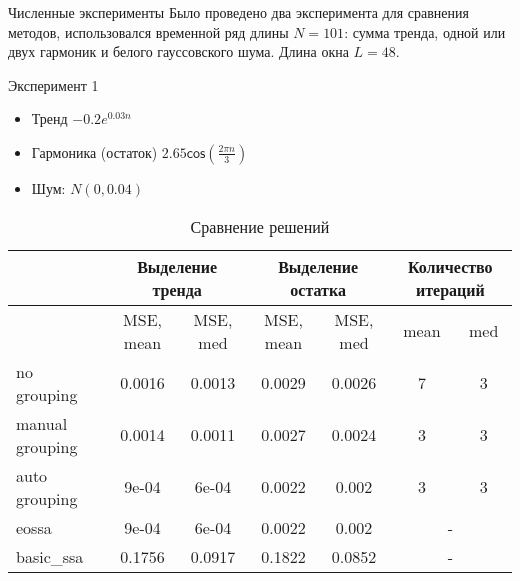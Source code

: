 \documentclass[ucs, notheorems, handout]{beamer}
\begin{document}
\begin{frame}{Численные эксперименты}
\small
    Было проведено два эксперимента для сравнения методов, использовался временной ряд длины $N = 101$: сумма тренда, одной или двух гармоник и белого гауссовского шума. Длина окна $L = 48$.

    Эксперимент 1
    \begin{itemize}
        \item Тренд $-0.2 e^{0.03n}$
        \item Гармоника (остаток) $2.65 \mathsf{cos}(\frac{2\pi n}{3})$
        \item Шум: ${N}(0, 0.04)$
    \end{itemize}

\begin{table}[h]
\tiny
\caption{\footnotesize Сравнение решений}
\begin{center}
\tabcolsep=0.11cm
\begin{tabular}{|l | c| c| c| c| c| c|}
\hline
 & \multicolumn{2}{c|}{Выделение тренда} & \multicolumn{2}{c|}{Выделение остатка} & \multicolumn{2}{c|}{Количество итераций} \\
 \hline
 & MSE, mean & MSE, med & MSE, mean & MSE, med & mean & med  \\
\hline
no grouping & 0.0016 &  0.0013 & 0.0029 &  0.0026 & 7 & 3 \\
manual grouping &  0.0014 & 0.0011 & 0.0027 & 0.0024 & 3 & 3 \\
auto grouping &  9e-04 & 6e-04 & 0.0022 & 0.002 & 3 & 3 \\
\hline
eossa & 9e-04 & 6e-04 & 0.0022 & 0.002 & \multicolumn{2}{c|}{-} \\
basic\_ssa &  0.1756 & 0.0917 & 0.1822 & 0.0852  & \multicolumn{2}{c|}{-} \\
\hline
\end{tabular}
\end{center}
\end{table}

\end{frame}
\end{document}
